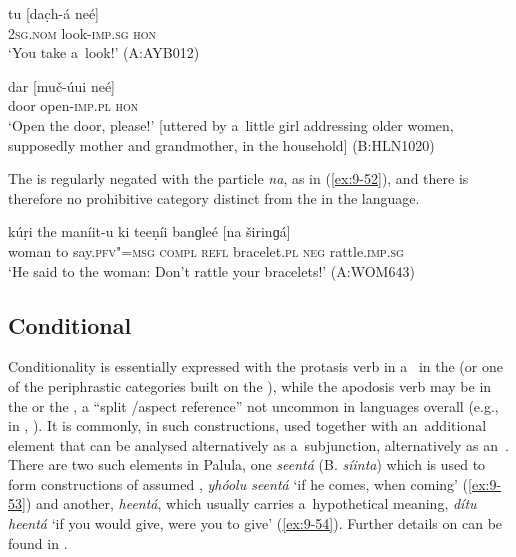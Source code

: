 \begin{exe}
\ex
\label{ex:9-50}
\gll tu [dac̣h-á neé] \\
\textsc{2sg.nom} look-\textsc{imp.sg} \textsc{hon}  \\
\glt `You take a~look!' (A:AYB012)

\ex
\label{ex:9-51}
\gll dar [muč-úui neé] \\
door open-\textsc{imp.pl} \textsc{hon} \\
\glt `Open the door, please!' [uttered by a~little girl addressing older women, supposedly mother and grandmother, in the household] (B:HLN1020)
\end{exe}

The  is regularly negated with the  particle \textit{na}, as in (\ref{ex:9-52}), and there is therefore no prohibitive category distinct from the  in the language.

\begin{exe}
\ex
\label{ex:9-52}
\gll kúṛi the maníit-u ki teeṇíi banɡleé [na širinɡá] \\
woman to say.\textsc{pfv"=msg} \textsc{compl} \textsc{refl} bracelet.\textsc{pl} \textsc{neg} rattle.\textsc{imp.sg} \\
\glt `He said to the woman: Don't rattle your bracelets!' (A:WOM643)
\end{exe}

\subsection{Conditional}
\label{subsec:9-2-2}

Conditionality is essentially expressed with the protasis verb in a~  in the  (or one of the periphrastic categories built on the ), while the apodosis verb may be in the  or the , a ``split /aspect reference'' not uncommon in languages overall (e.g., in , \citealt[80]{dahl1985}). It is commonly, in such constructions, used together with an~additional element that can be analysed alternatively as a~subjunction, alternatively as an~. There are two such elements in Palula, one \textit{seentá} (B. \textit{síinta}) which is used to form constructions of assumed , \textit{yhóolu seentá} `if he comes, when coming' (\ref{ex:9-53}) and another, \textit{heentá}, which usually carries a~hypothetical meaning, \textit{dítu heentá} `if you would give, were you to give' (\ref{ex:9-54}). Further details on  can be found in . 

